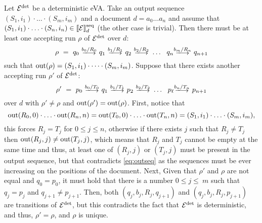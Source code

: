 Let $\mathcal{E}^{{\operatorname{det}}}$ be a deterministic eVA. Take an output sequence \mbox{$(S_1, i_1)\cdot \ldots \cdot (S_m, i_m)$} and a document $d = a_0\ldots a_n$ and assume that $(S_1, i_1)\cdot \ldots \cdot (S_n, i_n) \in \llbracket\mathcal{E}\rrbracket^{\operatorname{seq}}_d$ (the other case is trivial). Then there must be at least one accepting run $\rho$ of $\mathcal{E}^{{\operatorname{det}}}$ over $d$:
$$
\rho \ = \ q_0 \ \longtrans{b_0 / R_0} \ q_1 \ \longtrans{b_1 / R_1} \ q_2 \ \longtrans{b_2 / R_2} \ \ldots \ \ q_{n} \longtrans{b_{m} / R_n} \ q_{n+1}
$$
such that $\operatorname{out}(\rho) = (S_1, i_1)\cdot \cdots \cdot (S_m, i_m)$. Suppose that there exists another accepting run $\rho'$ of $\mathcal{E}^{{\operatorname{det}}}$:
$$
\rho' \ = \ p_0 \ \longtrans{b_0 / T_0} \ q_1 \ \longtrans{b_1 / T_1} \ p_2 \ \longtrans{b_2 / T_2} \ \ldots \ \ p_{\ell} \longtrans{b_n / T_n} \ p_{n+1}
$$
over $d$ with $\rho' \neq \rho$ and $\operatorname{out}(\rho') = \operatorname{out}(\rho)$. First, notice that 
\begin{equation} \label{eq:outseq}
    \operatorname{out}(R_0, 0)\cdot \ldots \cdot \operatorname{out}(R_n, n) = \operatorname{out}(T_0, 0)\cdot \ldots \cdot \operatorname{out}(T_n, n) = (S_1, i_1)\cdot \ldots \cdot (S_m, i_m),
\end{equation}
this forces $R_j = T_j$ for $0 \leq j \leq n$, otherwise if there exists $j$ such that $R_j \neq T_j$ then $\operatorname{out}(R_j, j) \neq \operatorname{out}(T_j, j)$, which means that $R_j$ and $T_j$ cannot be empty at the same time and thus, at least one of $(R_j, j)$ or $(T_j, j)$ must be present in the output sequence, but that contradicts \eqref{eq:outseq} as the sequences must be ever increasing on the positions of the document. Next, Given that $\rho'$ and $\rho$ are not equal and $q_0 = p_0$, it must hold that there is a number $0 \leq j \leq \ m$ such that $q_j = p_j$ and $q_{j+1} \neq p_{j+1}$. Then, both $(q_j, b_j, R_j, q_{j+1})$ and $(q_j, b_j, R_j, p_{j+1})$ are transitions of $\mathcal{E}^{\operatorname{det}}$, but this contradicts the fact that $\mathcal{E}^{{\operatorname{det}}}$ is deterministic, and thus, $\rho' = \rho$, and $\rho$ is unique.